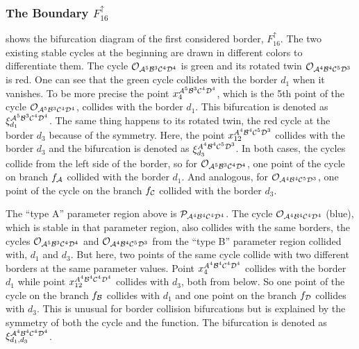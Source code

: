 

\subsubsection{The Boundary $F_{16}^\uparrow$}

 shows the bifurcation diagram of the first considered border, $F_{16}^\uparrow$.
The two existing stable cycles at the beginning are drawn in different colors to differentiate them.
The cycle $\mathcal{O}_{\mathcal{A}^5\mathcal{B}^3\mathcal{C}^4\mathcal{D}^4}$ is green and its rotated twin $\mathcal{O}_{\mathcal{A}^4\mathcal{B}^4\mathcal{C}^5\mathcal{D}^3}$ is red.
One can see that the green cycle collides with the border $d_1$ when it vanishes.
To be more precise the point $x_4^{\mathcal{A}^5\mathcal{B}^3\mathcal{C}^4\mathcal{D}^4}$, which is the 5th point of the cycle $\mathcal{O}_{\mathcal{A}^5\mathcal{B}^3\mathcal{C}^4\mathcal{D}^4}$, collides with the border $d_1$.
This bifurcation is denoted as $\xi_{d_1}^{\mathcal{A}^5\mathcal{B}^3\mathcal{C}^4\mathcal{D}^4}$.
The same thing happens to its rotated twin, the red cycle at the border $d_3$ because of the symmetry.
Here, the point $x_{12}^{A^4\mathcal{B}^4\mathcal{C}^5\mathcal{D}^3}$ collides with the border $d_3$ and the bifurcation is denoted as $\xi_{d_3}^{A^4\mathcal{B}^4\mathcal{C}^5\mathcal{D}^3}$.
In both cases, the cycles collide from the left side of the border, so for $\mathcal{O}_{\mathcal{A}^5\mathcal{B}^3\mathcal{C}^4\mathcal{D}^4}$, one point of the cycle on branch $f_{\mathcal{A}}$ collided with the border $d_1$.
And analogous, for $\mathcal{O}_{\mathcal{A}^4\mathcal{B}^4\mathcal{C}^5\mathcal{D}^3}$, one point of the cycle on the branch $f_{\mathcal{C}}$ collided with the border $d_3$.

The ``type A'' parameter region above is $\mathcal{P}_{\mathcal{A}^4\mathcal{B}^4\mathcal{C}^4\mathcal{D}^4}$.
The cycle $\mathcal{O}_{\mathcal{A}^4\mathcal{B}^4\mathcal{C}^4\mathcal{D}^4}$ (blue), which is stable in that parameter region, also collides with the same borders, the cycles $\mathcal{O}_{\mathcal{A}^5\mathcal{B}^3\mathcal{C}^4\mathcal{D}^4}$ and $\mathcal{O}_{\mathcal{A}^4\mathcal{B}^4\mathcal{C}^5\mathcal{D}^3}$ from the ``type B'' parameter region collided with, $d_1$ and $d_3$.
But here, two points of the same cycle collide with two different borders at the same parameter values.
Point $x_{4}^{A^4\mathcal{B}^4\mathcal{C}^4\mathcal{D}^4}$ collides with the border $d_1$ while point $x_{12}^{A^4\mathcal{B}^4\mathcal{C}^4\mathcal{D}^4}$ collides with $d_3$, both from below.
So one point of the cycle on the branch $f_{\mathcal{B}}$ collides with $d_1$ and one point on the branch $f_{\mathcal{D}}$ collides with $d_3$.
This is unusual for border collision bifurcations but is explained by the symmetry of both the cycle and the function.
The bifurcation is denoted as $\xi_{d_1, d_3}^{\mathcal{A}^4\mathcal{B}^4\mathcal{C}^4\mathcal{D}^4}$.

